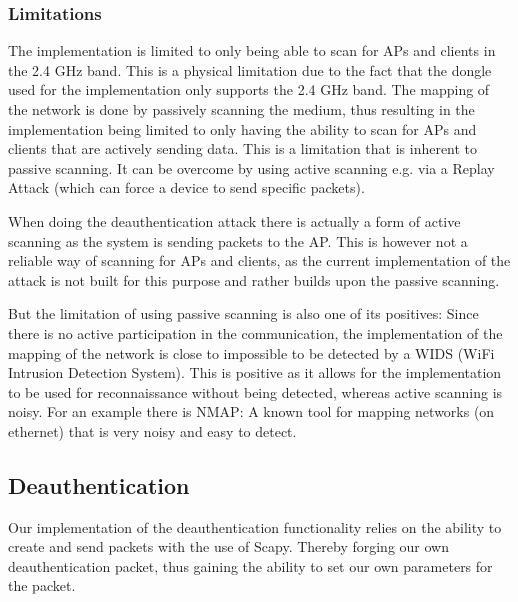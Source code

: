 \subsubsection{Limitations}
The implementation is limited to only being able to scan for APs and clients in the 2.4 GHz band. This is a physical limitation due to the fact that the dongle used for the implementation only supports the 2.4 GHz band.
The mapping of the network is done by passively scanning the medium, thus resulting in the implementation being limited to only having the ability to scan for APs and clients that are actively sending data. This is a limitation that is inherent to passive scanning. It can be overcome by using active scanning e.g. via a Replay Attack (which can force a device to send specific packets).

When doing the deauthentication attack there is actually a form of active scanning as the system is sending packets to the AP. This is however not a reliable way of scanning for APs and clients, as the current implementation of the attack is not built for this purpose and rather builds upon the passive scanning.

But the limitation of using passive scanning is also one of its positives: Since there is no active participation in the communication, the implementation of the mapping of the network is close to impossible to be detected by a WIDS (WiFi Intrusion Detection System). This is positive as it allows for the implementation to be used for reconnaissance without being detected, whereas active scanning is noisy. For an example there is NMAP: A known tool for mapping networks (on ethernet) that is very noisy and easy to detect.

\newpage
\subsection{Deauthentication}
Our implementation of the deauthentication functionality relies on the ability to create and send packets with the use of Scapy. Thereby forging our own deauthentication packet, thus gaining the ability to set our own parameters for the packet.

